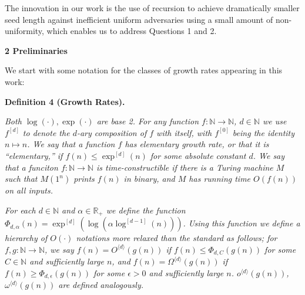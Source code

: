 The innovation in our work is the use of recursion to achieve dramatically smaller seed length against inefficient uniform adversaries using a small amount of non-uniformity, which enables us to address Questions 1 and 2.\par






\par\medskip\noindent\textbf{
2 Preliminaries}\par




We start with some notation for the classes of growth rates appearing in this work:\par





\par\medskip\noindent\textbf{
\textbf{Definition 4}\textbf{ }(Growth Rates)\textbf{.}
}\par



\emph{Both $\log(\cdot),\exp(\cdot)$ are base 2. For any function $f:\mathbb{N}\to\mathbb{N}$, $d\in\mathbb{N}$ we use $f^{[d]}$ to denote the $d$-ary composition of $f$ with itself, with $f^{[0]}$ being the identity $n\mapsto n$. We say that a function $f$ has elementary growth rate, or that it is “elementary,” if $f(n)\leq\exp^{[d]}(n)$ for some absolute constant $d$. We say that a funciton $f:\mathbb{N}\to\mathbb{N}$ is time-constructible if there is a Turing machine $M$ such that $M(1^{n})$ prints $f(n)$ in binary, and $M$ has running time $O(f(n))$ on all inputs.}\par




\emph{For each $d\in\mathbb{N}$ and $\alpha\in\mathbb{R}_{+}$ we define the function $\Phi_{d,\alpha}(n)=\exp^{[d]}(\log(\alpha\log^{[d-1]}(n)))$.
Using this function we define a hierarchy of $O(\cdot)$ notations more relaxed than the standard as follows; for $f,g:\mathbb{N}\to\mathbb{N}$, we say $f(n)=O^{\langle d\rangle}(g(n))$ if $f(n)\leq\Phi_{d,C}(g(n))$ for some $C\in\mathbb{N}$ and sufficiently large $n$, and $f(n)=\Omega^{\langle d\rangle}(g(n))$ if $f(n)\geq\Phi_{d,\epsilon}(g(n))$ for some $\epsilon>0$ and sufficiently large $n$. $o^{\langle d\rangle}(g(n))$, $\omega^{\langle d\rangle}(g(n))$ are defined analogously.}\par



